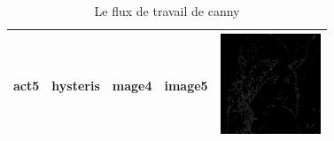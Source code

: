 \begin {table}[!h]
\begin{tabular} {|p{2cm}|p{2cm}|p{2cm}|p{2cm}||p{3cm}|}
  \hline

    act5 & hysteris & mage4 & image5 & \includegraphics[width=3cm, height=3cm]{images/5.png}\\

  \hline

\end{tabular}
\caption{Le flux de travail de canny}
\end{table}
